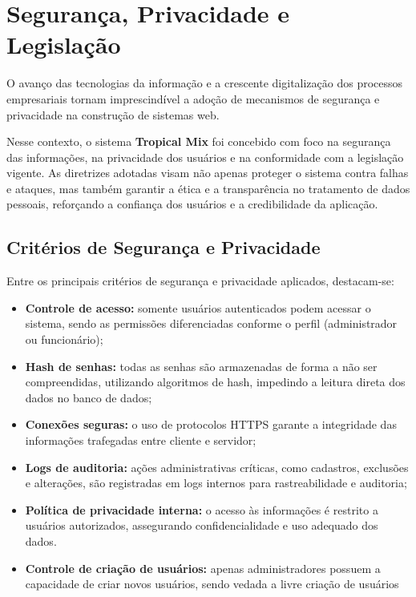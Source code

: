 \section{Segurança, Privacidade e Legislação}

O avanço das tecnologias da informação e a crescente digitalização dos processos empresariais tornam imprescindível a adoção de mecanismos de segurança e privacidade na construção de sistemas web. 

Nesse contexto, o sistema \textbf{Tropical Mix} foi concebido com foco na segurança das informações, na privacidade dos usuários e na conformidade com a legislação vigente. As diretrizes adotadas visam não apenas proteger o sistema contra falhas e ataques, mas também garantir a ética e a transparência no tratamento de dados pessoais, reforçando a confiança dos usuários e a credibilidade da aplicação.

\subsection{Critérios de Segurança e Privacidade}

Entre os principais critérios de segurança e privacidade aplicados, destacam-se:

\begin{itemize}
    \item \textbf{Controle de acesso:} somente usuários autenticados podem acessar o sistema, sendo as permissões diferenciadas conforme o perfil (administrador ou funcionário);
    \item \textbf{Hash de senhas:} todas as senhas são armazenadas de forma a não ser compreendidas, utilizando algoritmos de hash, impedindo a leitura direta dos dados no banco de dados;
    \item \textbf{Conexões seguras:} o uso de protocolos HTTPS garante a integridade das informações trafegadas entre cliente e servidor;
    \item \textbf{Logs de auditoria:} ações administrativas críticas, como cadastros, exclusões e alterações, são registradas em logs internos para rastreabilidade e auditoria;
    \item \textbf{Política de privacidade interna:} o acesso às informações é restrito a usuários autorizados, assegurando confidencialidade e uso adequado dos dados.
    \item \textbf{Controle de criação de usuários:} apenas administradores possuem a capacidade de criar novos usuários, sendo vedada a livre criação de usuários
\end{itemize}

